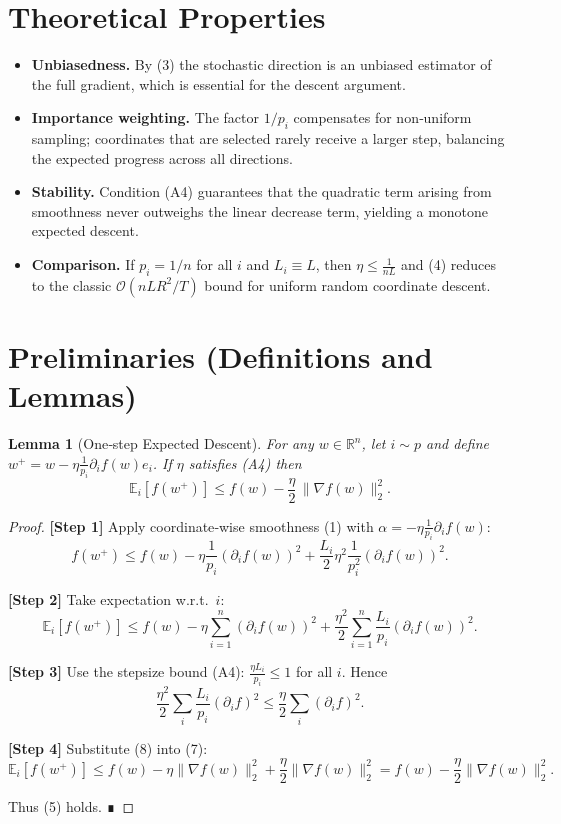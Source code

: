 \documentclass{article}
\newtheorem{lemma}{Lemma}
\newcommand{\E}{\mathbb{E}}
\newcommand{\R}{\mathbb{R}}
\begin{document}
\section*{Theoretical Properties}
\begin{itemize}
\item \textbf{Unbiasedness.} By (3) the stochastic direction is an unbiased estimator of the full gradient, which is essential for the descent argument.
\item \textbf{Importance weighting.} The factor $1/p_i$ compensates for non‑uniform sampling; coordinates that are selected rarely receive a larger step, balancing the expected progress across all directions.
\item \textbf{Stability.} Condition (A4) guarantees that the quadratic term arising from smoothness never outweighs the linear decrease term, yielding a monotone expected descent.
\item \textbf{Comparison.} If $p_i=1/n$ for all $i$ and $L_i\equiv L$, then $\eta\le \frac{1}{nL}$ and (4) reduces to the classic $\mathcal{O}(nL R^{2}/T)$ bound for uniform random coordinate descent.
\end{itemize}

\section*{Preliminaries (Definitions and Lemmas)}
\begin{lemma}[One‑step Expected Descent]
\label{lem:descent}
For any $w\in\R^{n}$, let $i\sim p$ and define $w^{+}=w-\eta\frac{1}{p_i}\partial_i f(w)e_i$.  
If $\eta$ satisfies (A4) then
\[
\E_{i}\!\left[f(w^{+})\right]\le f(w)-\frac{\eta}{2}\,\|\nabla f(w)\|_{2}^{2}.
\tag{5}
\]
\end{lemma}
\begin{proof}
\textbf{[Step 1]} Apply coordinate‑wise smoothness (1) with $\alpha=-\eta\frac{1}{p_i}\partial_i f(w)$:
\[
f(w^{+})\le f(w)-\eta\frac{1}{p_i}(\partial_i f(w))^{2}
+\frac{L_i}{2}\eta^{2}\frac{1}{p_i^{2}}(\partial_i f(w))^{2}.
\tag{6}
\]

\textbf{[Step 2]} Take expectation w.r.t.\ $i$:
\[
\E_{i}[f(w^{+})]\le f(w)-\eta\sum_{i=1}^{n}(\partial_i f(w))^{2}
+\frac{\eta^{2}}{2}\sum_{i=1}^{n}\frac{L_i}{p_i}(\partial_i f(w))^{2}.
\tag{7}
\]

\textbf{[Step 3]} Use the stepsize bound (A4): $\displaystyle \frac{\eta L_i}{p_i}\le 1$ for all $i$. Hence
\[
\frac{\eta^{2}}{2}\sum_{i}\frac{L_i}{p_i}(\partial_i f)^{2}
\le\frac{\eta}{2}\sum_{i}(\partial_i f)^{2}.
\tag{8}
\]

\textbf{[Step 4]} Substitute (8) into (7):
\[
\E_{i}[f(w^{+})]\le f(w)-\eta\|\nabla f(w)\|_{2}^{2}
+\frac{\eta}{2}\|\nabla f(w)\|_{2}^{2}
= f(w)-\frac{\eta}{2}\|\nabla f(w)\|_{2}^{2}.
\tag{9}
\]

Thus (5) holds. ∎
\end{proof}
\end{document}
